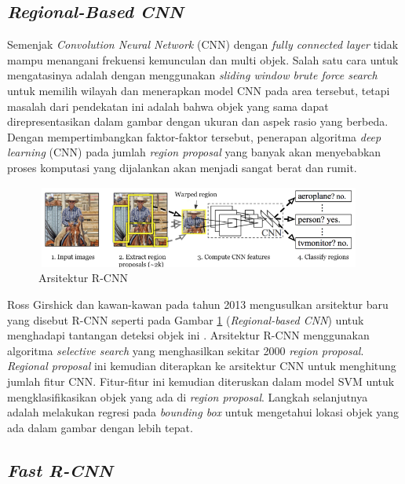 \subsection{\textit{Regional-Based CNN}}
\label{subsec:rcnn}

Semenjak\textit{ Convolution Neural Network} (CNN) dengan \textit{fully connected layer} tidak mampu menangani frekuensi kemunculan dan multi objek. Salah satu cara untuk mengatasinya adalah dengan menggunakan \textit{sliding window brute force search} untuk memilih wilayah dan menerapkan model CNN pada area tersebut, tetapi masalah dari pendekatan ini adalah bahwa objek yang sama dapat direpresentasikan dalam gambar dengan ukuran dan aspek rasio yang berbeda. Dengan mempertimbangkan faktor-faktor tersebut, penerapan algoritma \textit{deep learning} (CNN) pada jumlah \textit{region proposal} yang banyak akan menyebabkan proses komputasi yang dijalankan akan menjadi sangat berat dan rumit.

\begin{figure}[h!]
	\centering
	\includegraphics[scale=0.3]{gambar/rcnn.png}
	\caption{Arsitektur R-CNN \citep{arch-rcnn}}
	\label{fig:rcnn}
\end{figure}

Ross Girshick dan kawan-kawan pada tahun 2013 mengusulkan arsitektur baru yang disebut R-CNN seperti pada Gambar \ref{fig:rcnn} (\textit{Regional-based CNN}) untuk menghadapi tantangan deteksi objek ini \citep{rcnn}. Arsitektur R-CNN menggunakan algoritma \textit{selective search} yang menghasilkan sekitar 2000 \textit{region proposal}. \textit{Regional proposal} ini kemudian diterapkan ke arsitektur CNN untuk menghitung jumlah fitur CNN. Fitur-fitur ini kemudian diteruskan dalam model SVM untuk mengklasifikasikan objek yang ada di \textit{region proposal}. Langkah selanjutnya adalah melakukan regresi pada \textit{bounding box} untuk mengetahui lokasi objek yang ada dalam gambar dengan lebih tepat. 

\subsection{\textit{Fast R-CNN}}
\label{subsec:fast-rcnn}

